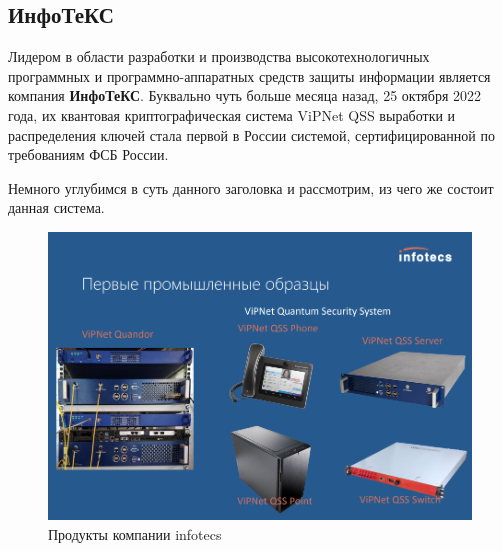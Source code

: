 \subsection{ИнфоТеКС}

Лидером в области разработки и производства высокотехнологичных программных и программно-аппаратных средств защиты информации является компания \textbf{ИнфоТеКС}.
Буквально чуть больше месяца назад, 25 октября 2022 года, их квантовая криптографическая система ViPNet QSS выработки и распределения ключей стала первой в России системой, сертифицированной по требованиям ФСБ России.

Немного углубимся в суть данного заголовка и рассмотрим, из чего же состоит данная система. 

\begin{figure}[h!]
    \centering
    \includegraphics[width=1.0\linewidth]{pics/vipnet_qss.png}
    \caption{Продукты компании infotecs}
    \label{infotecs_product}
\end{figure}

